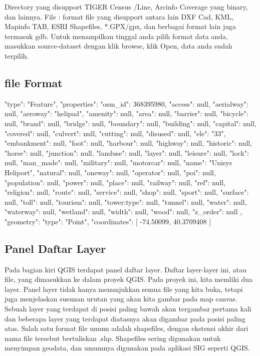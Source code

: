 Directory yang disupport TIGER Census /Line, Arcinfo Coverage yang binary, dan lainnya.
File : format file yang disupport antara lain DXF Cad, KML, Mapinfo TAB, ESRI Shapefiles, *.GPX/gpx, dan berbagai format lain juga termasuk gdb.
Untuk menampilkan tinggal anda pilih format data anda,
masukkan source-dataset dengan klik browse, klik Open, data anda sudah terpilih.


\subsection{file Format}
{
"type": "Feature",
"properties": {
    "osm_id": 368395980,
    "access": null,
    "aerialway": null,
    "aeroway": "helipad",
    "amenity": null,
    "area": null,
    "barrier": null,
    "bicycle": null,
    "brand": null,
    "bridge": null,
    "boundary": null,
    "building": null,
    "capital": null,
    "covered": null,
    "culvert": null,
    "cutting": null,
    "disused": null,
    "ele": "33",
    "embankment": null,
    "foot": null,
    "harbour": null,
    "highway": null,
    "historic": null,
    "horse": null,
    "junction": null,
    "landuse": null,
    "layer": null,
    "leisure": null,
    "lock": null,
    "man_made": null,
    "military": null,
    "motorcar": null,
    "name": "Unisys Heliport",
    "natural": null,
    "oneway": null,
    "operator": null,
    "poi": null,
    "population": null,
    "power": null,
    "place": null,
    "railway": null,
    "ref": null,
    "religion": null,
    "route": null,
    "service": null,
    "shop": null,
    "sport": null,
    "surface": null,
    "toll": null,
    "tourism": null,
    "tower:type": null,
    "tunnel": null,
    "water": null,
    "waterway": null,
    "wetland": null,
    "width": null,
    "wood": null,
    "z_order": null
},
"geometry": {
    "type": "Point",
    "coordinates": [
        -74.50099,
        40.3709408
    ]
}
}

\subsection{Panel Daftar Layer}
    Pada bagian kiri QGIS terdapat panel daftar layer. Daftar layer-layer ini, atau file, yang dimasukkan ke dalam proyek QGIS. Pada proyek ini, kita memliki dua layer.
    Panel layer tidak hanya menunjukkan semua file yang kita buka, tetapi juga menjelaskan susunan urutan yang akan kita gambar pada map canvas. Sebuah layer yang terdapat di posisi paling bawah akan tergambar pertama kali dan beberapa layer yang terdapat diatasnya akan digambar pada posisi paling atas.
    Salah satu format file umum adalah shapefiles, dengan ekstensi akhir dari nama file tersebut bertuliskan .shp. Shapefiles sering digunakan untuk menyimpan geodata, dan umumnya digunakan pada aplikasi SIG seperti QGIS.

